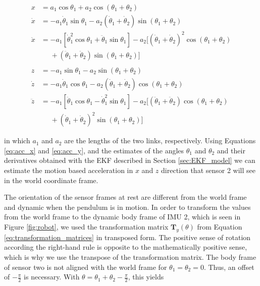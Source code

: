 \begin{align}
  x &= a_1 \cos \theta_1 + a_2 \cos(\theta_1 + \theta_2) \\
  \dot{x} &= -a_1 \dot{\theta}_1 \sin \theta_1  - a_2 (\dot{\theta}_1 + \dot{\theta}_2) \sin(\theta_1 + \theta_2) \\
  \ddot{x} {}&= -a_1 [\dot{\theta}^2_1 \cos \theta_1 + \ddot{\theta}_1 \sin \theta_1] - a_2 [(\dot{\theta}_1 + \dot{\theta}_2)^2 \cos(\theta_1 + \theta_2) \nonumber \\ 
  &\mathrel{\phantom{=}} + (\ddot{\theta}_1 + \ddot{\theta}_2) \sin(\theta_1 + \theta_2)] \label{eq:acc_x} \\
  \nonumber \\
  z &= -a_1 \sin \theta_1 - a_2 \sin(\theta_1 + \theta_2) \\
  \dot{z} &= -a_1 \dot{\theta}_1 \cos \theta_1  - a_2 (\dot{\theta}_1 + \dot{\theta}_2) \cos(\theta_1 + \theta_2) \\
  \ddot{z} {}&= -a_1 [\ddot{\theta}_1 \cos \theta_1 - \dot{\theta}^2_1 \sin \theta_1] - a_2 [(\ddot{\theta}_1 + \ddot{\theta}_2) \cos(\theta_1 + \theta_2) \nonumber \\ 
  &\mathrel{\phantom{=}} + (\dot{\theta}_1 + \dot{\theta}_2)^2 \sin(\theta_1 + \theta_2)] \label{eq:acc_y}
\end{align}

\noindent
in which $a_1$ and $a_2$ are the lengths of the two links, respectively. Using Equations \ref{eq:acc_x} and \ref{eq:acc_y}, and the estimates of the angles $\theta_1$ and $\theta_2$ and their derivatives obtained with the EKF described in Section \ref{sec:EKF_model} we can estimate the motion based acceleration in $x$ and $z$ direction that sensor 2 will see in the world coordinate frame.

The orientation of the sensor frames at rest are different from the world frame and dynamic when the pendulum is in motion. In order to transform the values from the world frame to the dynamic body frame of \gls{IMU} 2, which is seen in Figure \ref{fig:robot}, we used the transformation matrix $\mathbf{T}_y(\theta)$ from Equation \ref{eq:transformation_matrices} in transposed form. The positive sense of rotation according the right-hand rule is opposite to the mathematically positive sense, which is why we use the transpose of the transformation matrix. The body frame of sensor two is not aligned with the world frame for $\theta_1 = \theta_2 = 0$. Thus, an offset of $-\frac{\pi}{2}$ is necessary. With $\theta = \theta_1 + \theta_2 - \frac{\pi}{2}$, this yields

